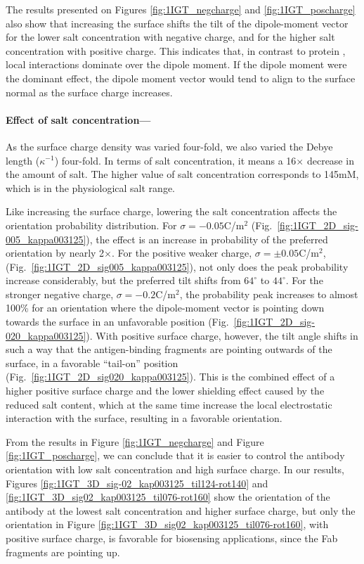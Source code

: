 The results presented on Figures \ref{fig:1IGT_negcharge} and \ref{fig:1IGT_poscharge} also show that increasing the surface shifts the tilt of the dipole-moment vector for the lower salt concentration with negative charge, and for the higher salt concentration with positive charge. This indicates that, in contrast to protein \gb, local interactions dominate over the dipole moment. If the dipole moment were the dominant effect, the dipole moment vector would tend to align to the surface normal as the surface charge increases.
 
 \medskip
 
 \paragraph*{Effect of salt concentration---}
 
As the surface charge density was varied four-fold, we also varied the Debye length ($\kappa^{-1}$) four-fold. In terms of salt concentration, it means a 16$\times$ decrease in the amount of salt. The higher value of salt concentration corresponds to 145mM, which is in the physiological salt range.  
 
 Like increasing the surface charge, lowering the salt concentration affects the orientation probability distribution. For $\sigma=-0.05$C/m$^2$ (Fig.~\ref{fig:1IGT_2D_sig-005_kappa003125}), the effect is an increase in probability of the preferred orientation by nearly 2$\times$. For the positive weaker charge, $\sigma=\pm0.05$C/m$^2$, (Fig.~\ref{fig:1IGT_2D_sig005_kappa003125}), not only does the peak probability increase considerably, but the preferred tilt shifts from $64^{\circ}$ to $44^{\circ}$.
 For the stronger negative charge, $\sigma=-0.2$C/m$^2$, the probability peak increases to almost 100\% for an orientation where the dipole-moment vector is pointing down towards the surface in an unfavorable position (Fig.~\ref{fig:1IGT_2D_sig-020_kappa003125}).
 With positive surface charge, however, the tilt angle shifts in such a way that the antigen-binding fragments are pointing outwards of the surface, in a favorable ``tail-on'' position (Fig.~\ref{fig:1IGT_2D_sig020_kappa003125}). This is the combined effect of a higher positive surface charge and the lower shielding effect caused by the reduced salt content, which at the same time increase the local electrostatic interaction with the surface, resulting in a favorable orientation.

From the results in Figure \ref{fig:1IGT_negcharge} and Figure \ref{fig:1IGT_poscharge}, we can conclude that it is easier to control the antibody orientation with low salt concentration and high surface charge. 
In our results, Figures \ref{fig:1IGT_3D_sig-02_kap003125_til124-rot140} and \ref{fig:1IGT_3D_sig02_kap003125_til076-rot160} show the orientation of the antibody at the lowest salt concentration and higher surface charge, but only the orientation in Figure \ref{fig:1IGT_3D_sig02_kap003125_til076-rot160}, with positive surface charge, is favorable for biosensing applications, since the Fab fragments are pointing up.


